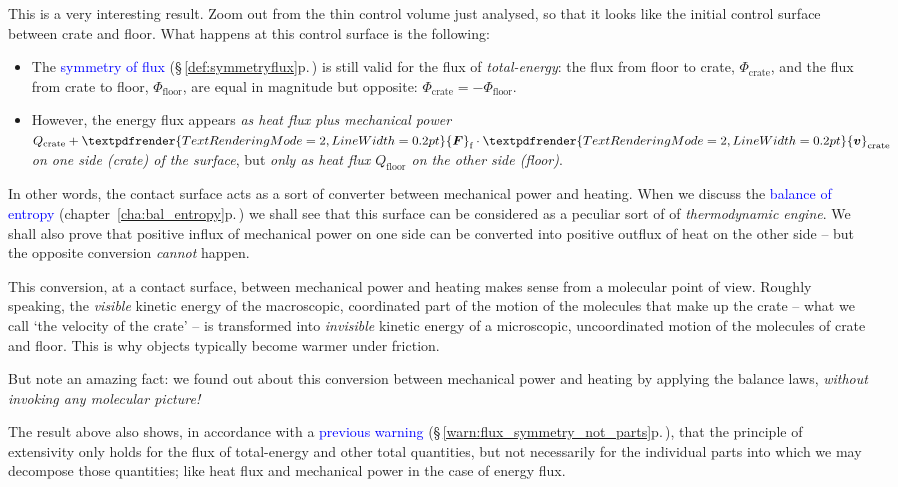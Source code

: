 \documentclass[a4paper,12pt,%
onecolumn,oneside,%
british%
]{memoir}
\renewcommand*{\bm}[1]{\textpdfrender{TextRenderingMode=2,LineWidth=0.2pt}{\boldsymbol{#1}}}
\renewcommand*{\|}[1][]{\nonscript\:#1\vert\nonscript\:\mathopen{}}
\newcommand*{\sect}{\S}%
\newcommand*{\chap}{chapter}%
\renewcommand*{\autoref}[3][\sect\,\ref]{\textcolor{blue}{#3} {\color{blue}\scriptsize(\faIcon[regular]{eye}\;#1{#2}\;p.\,\pageref{#2})}}
\newcommand*{\yv}{\bm{v}}
\newcommand*{\yvc}{\yv_{\textrm{crate}}}
\newcommand*{\yH}{\varPhi}%
\newcommand*{\yHfl}{\yH_{\textrm{floor}}}
\newcommand*{\yHc}{\yH_{\textrm{crate}}}
\newcommand*{\yQ}{Q}%
\newcommand*{\yQc}{\yQ_{\textrm{crate}}}
\newcommand*{\yQfl}{\yQ_{\textrm{floor}}}
\newcommand*{\yF}{\bm{F}}
\newcommand*{\yFf}{\yF_{\textrm{f}}}
\begin{document}
This is a very interesting result. Zoom out from the thin control volume just analysed, so that it looks like the initial control surface between crate and floor. What happens at this control surface is the following:
\begin{itemize}
\item The \autoref{def:symmetryflux}{symmetry of flux} is still valid for the flux of \emph{total-energy}: the flux from floor to crate, $\yHc$, and the flux from crate to floor, $\yHfl$, are equal in magnitude but opposite: $\yHc = -\yHfl$.
\item However, the energy flux appears \emph{as heat flux plus mechanical power $\yQc + \yFf \cdot \yvc$ on one side (crate) of the surface}, but \emph{only as heat flux $\yQfl$ on the other side (floor)}.
\end{itemize}

In other words, the contact surface acts as a sort of converter between mechanical power and heating. When we discuss the \autoref[\chap~\ref]{cha:bal_entropy}{balance of entropy} we shall see that this surface can be considered as a peculiar sort of of \emph{thermodynamic engine}. We shall also prove that positive influx of mechanical power on one side can be converted into positive outflux of heat on the other side -- but the opposite conversion \emph{cannot} happen.

This conversion, at a contact surface, between mechanical power and heating makes sense from a molecular point of view. Roughly speaking, the \emph{visible} kinetic energy of the macroscopic, coordinated part of the motion of the molecules that make up the crate -- what we call \enquote*{the velocity of the crate} -- is transformed into \emph{invisible} kinetic energy of a microscopic, uncoordinated motion of the molecules of crate and floor. This is why objects typically become warmer under friction.

But note an amazing fact: we found out about this conversion between mechanical power and heating by applying the balance laws, \emph{without invoking any molecular picture!}

\medskip

The result above also shows, in accordance with a \autoref{warn:flux_symmetry_not_parts}{previous warning}, that the principle of extensivity only holds for the flux of total-energy and other total quantities, but not necessarily for the individual parts into which we may decompose those quantities; like heat flux and mechanical power in the case of energy flux.
\end{document}
